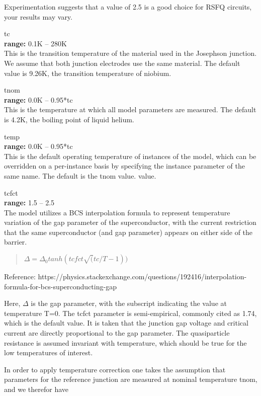 \begin{description}
Experimentation suggests that a value of 2.5 is a good choice for RSFQ
circuits, your results may vary.

\item{\vt tc}\\
{\bf range:} 0.1K -- 280K\\
This is the transition temperature of the material used in the
Josephson junction.  We assume that both junction electrodes use the
same material.  The default value is 9.26K, the transition temperature
of niobium.

\item{\vt tnom}\\
{\bf range:} 0.0K -- 0.95*{\vt tc}\\
This is the temperature at which all model parameters are measured. 
The default is 4.2K, the boiling point of liquid helium.

\item{\vt temp}\\
{\bf range:} 0.0K -- 0.95*{\vt tc}\\
This is the default operating temperature of instances of the model,
which can be overridden on a per-instance basis by specifying the
instance parameter of the same name.  The default is the {\vt tnom}
value.  value.

{\vt tcfct}\\
{\bf range:} 1.5 -- 2.5\\
The model utilizes a BCS interpolation formula to represent
temperature variation of the gap parameter of the superconductor, with
the current restriction that the same superconductor (and gap
parameter) appears on either side of the barrier.

\begin{quote}
$\Delta = \Delta_0 tanh(tcfct\sqrt(tc/T-1))$
\end{quote}
Reference: {\vt https://physics.stackexchange.com/questions/192416/interpolation-formula-for-bcs-superconducting-gap}

Here, $\Delta$ is the gap parameter, with the subscript indicating the
value at temperature T=0.  The {\vt tcfct} parameter is
semi-empirical, commonly cited as 1.74, which is the default value. 
It is taken that the junction gap voltage and critical current are
directly proportional to the gap parameter.  The quasiparticle
resistance is assumed invariant with temperature, which should be true
for the low temperatures of interest.

In order to apply temperature correction one takes the assumption that
parameters for the reference junction are measured at nominal
temperature {\vt tnom}, and we therefor have


\end{description}
